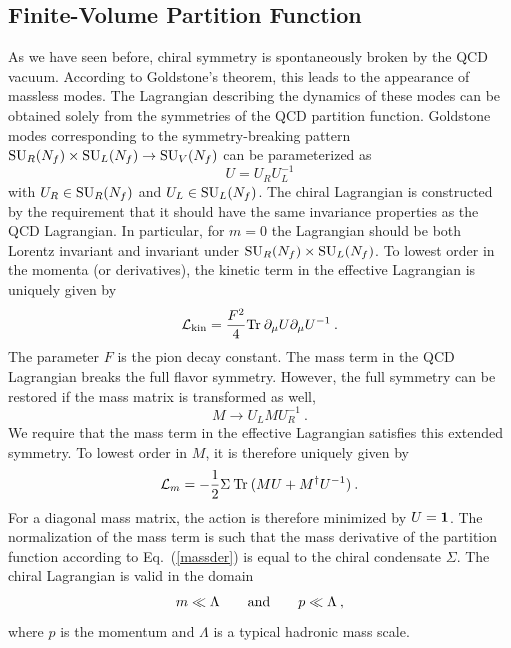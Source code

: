 \subsection{Finite-Volume Partition Function}
\label{Finite-Volume}
As we have seen before, chiral symmetry is spontaneously broken by the
QCD vacuum.  According to Goldstone's theorem, this leads to the
appearance of massless modes. The Lagrangian describing the dynamics
of these modes can be obtained solely from the symmetries of the
QCD partition function.  Goldstone modes corresponding to the
symmetry-breaking pattern ${\rm SU}_R(N_f) \times {\rm SU}_L(N_f)
\rightarrow {\rm SU}_V(N_f)$ can be parameterized as
\begin{equation}
  U =  U_R U_L^{-1}
\end{equation}
with $U_R \in {\rm SU}_R(N_f)$ and $U_L \in {\rm SU}_L(N_f)$. The
chiral Lagrangian is constructed by the requirement that it should
have the same invariance properties as the QCD Lagrangian. In
particular, for $m=0$ the Lagrangian should be both Lorentz invariant
and invariant under ${\rm SU}_R(N_f) \times {\rm SU}_L(N_f)$. To
lowest order in the momenta (or derivatives), the kinetic term in the
effective Lagrangian is uniquely given by \cite{Weinberg,GaL}
\begin{equation}
  \label{Lkin}
  {\cal L}_{\rm kin} = \frac {F^2}4 {\rm Tr\:} \partial_\mu U \partial_\mu
  U^{-1}\:.
\end{equation}
The parameter $F$ is the pion decay constant.  The mass term in the
QCD Lagrangian breaks the full flavor symmetry. However, the full
symmetry can be restored if the mass matrix is transformed as well,
\begin{equation}
  M \rightarrow U_L M U_R^{-1}\:. 
\end{equation}
We require that the mass term in the effective Lagrangian satisfies
this extended symmetry. To lowest order in $M$, it is therefore
uniquely given by
\begin{equation}
  \label{Lmass}
  {\cal L}_m = -\frac 12\Sigma\: {\rm Tr\:} (MU + M^\dagger U^{-1})\:.
\end{equation}
For a diagonal mass matrix, the action is therefore
minimized by $U = {\bf 1}$.  The normalization of the mass term is
such that the mass derivative of the partition function according to
Eq.~(\ref{massder}) is equal to the chiral condensate $\Sigma$. The
chiral Lagrangian is valid in the domain
\begin{equation}
  \label{domain1}
  m\ll \Lambda\qquad{\rm and}\qquad p \ll \Lambda\:,
\end{equation}
where $p$ is the momentum and $\Lambda$ is a typical hadronic mass
scale.

